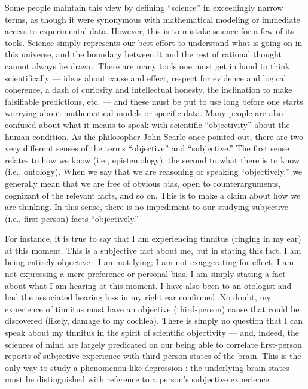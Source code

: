 \documentclass[a4paper,14pt]{extbook}
\begin{document}
Some people maintain this view by defining ``science'' in exceedingly narrow terms, as though it were synonymous with mathematical modeling or immediate access to experimental data.
However, this is to mistake science for a few of its tools.
Science simply represents our best effort to understand what is going on in this universe, and the boundary between it and the rest of rational thought cannot always be drawn.
There are many tools one must get in hand to think scientifically --- ideas about cause and effect, respect for evidence and logical coherence, a dash of curiosity and intellectual honesty, the inclination to make falsifiable predictions, etc. --- and these must be put to use long before one starts worrying about mathematical models or specific data.
Many people are also confused about what it means to speak with scientific ``objectivity'' about the human condition.
As the philosopher John Searle once pointed out, there are two very different senses of the terms ``objective'' and ``subjective.''
The first sense relates to how we know (i.e., epistemology), the second to what there is to know (i.e., ontology).
When we say that we are reasoning or speaking ``objectively,'' we generally mean that we are free of obvious bias, open to counterarguments, cognizant of the relevant facts, and so on.
This is to make a claim about how we are thinking.
In this sense, there is no impediment to our studying subjective (i.e., first-person) facts ``objectively.''

For instance, it is true to say that I am experiencing tinnitus (ringing in my ear) at this moment.
This is a subjective fact about me, but in stating this fact, I am being entirely objective :
I am not lying;
I am not exaggerating for effect;
I am not expressing a mere preference or personal bias.
I am simply stating a fact about what I am hearing at this moment.
I have also been to an otologist and had the associated hearing loss in my right ear confirmed.
No doubt, my experience of tinnitus must have an objective (third-person) cause that could be discovered (likely, damage to my cochlea).
There is simply no question that I can speak about my tinnitus in the spirit of scientific objectivity --- and, indeed, the sciences of mind are largely predicated on our being able to correlate first-person reports of subjective experience with third-person states of the brain.
This is the only way to study a phenomenon like depression :
the underlying brain states must be distinguished with reference to a person's subjective experience.
\end{document}

